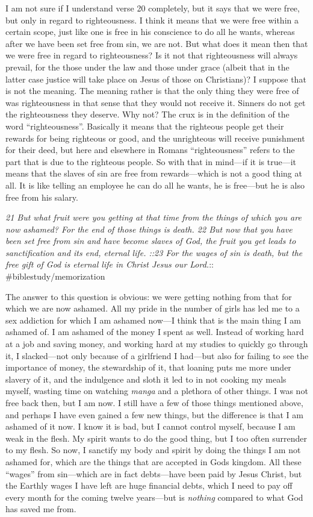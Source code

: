 I am not sure if I understand verse 20 completely, but it says that we
were free, but only in regard to righteousness. I think it means that we
were free within a certain scope, just like one is free in his
conscience to do all he wants, whereas after we have been set free from
sin, we are not. But what does it mean then that we were free in regard
to righteousness? Is it not that righteousness will always prevail, for
the those under the law and those under grace (albeit that in the latter
case justice will take place on Jesus of those on Christians)? I suppose
that is not the meaning. The meaning rather is that the only thing they
were free of was righteousness in that sense that they would not receive
it. Sinners do not get the righteousness they deserve. Why not? The crux
is in the definition of the word ``righteousness''. Basically it means
that the righteous people get their rewards for being righteous or good,
and the unrighteous will receive punishment for their deed, but here and
elsewhere in Romans ``righteousness'' refers to the part that is due to
the righteous people. So with that in mind---if it is true---it means
that the slaves of sin are free from rewards---which is not a good thing
at all. It is like telling an employee he can do all he wants, he is
free---but he is also free from his salary.

\emph{21 But what fruit were you getting at that time from the things of
which you are now ashamed? For the end of those things is death. 22 But
now that you have been set free from sin and have become slaves of God,
the fruit you get leads to sanctification and its end, eternal life.
::23 For the wages of sin is death, but the free gift of God is eternal
life in Christ Jesus our Lord.}:: \#biblestudy/memorization

The answer to this question is obvious: we were getting nothing from
that for which we are now ashamed. All my pride in the number of girls
has led me to a sex addiction for which I am ashamed now---I think that
is the main thing I am ashamed of. I am ashamed of the money I spent as
well. Instead of working hard at a job and saving money, and working
hard at my studies to quickly go through it, I slacked---not only
because of a girlfriend I had---but also for failing to see the
importance of money, the stewardship of it, that loaning puts me more
under slavery of it, and the indulgence and sloth it led to in not
cooking my meals myself, wasting time on watching \emph{manga} and a
plethora of other things. I was not free back then, but I am now. I
still have a few of those things mentioned above, and perhaps I have
even gained a few new things, but the difference is that I am ashamed of
it now. I know it is bad, but I cannot control myself, because I am weak
in the flesh. My spirit wants to do the good thing, but I too often
surrender to my flesh. So now, I sanctify my body and spirit by doing
the things I am not ashamed for, which are the things that are accepted
in Gods kingdom. All these ``wages'' from sin---which are in fact
debts---have been paid by Jesus Christ, but the Earthly wages I have
left are huge financial debts, which I need to pay off every month for
the coming twelve years---but is \emph{nothing} compared to what God has
saved me from.

